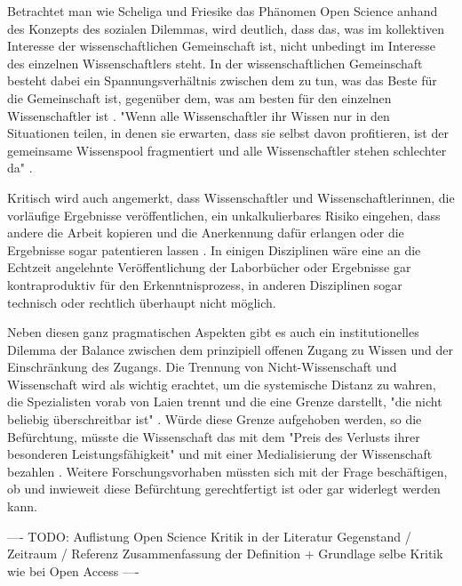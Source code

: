 Betrachtet man wie Scheliga und Friesike das Phänomen Open Science anhand des Konzepts des sozialen Dilemmas, wird deutlich, dass das, was im kollektiven Interesse der wissenschaftlichen Gemeinschaft ist, nicht unbedingt im Interesse des einzelnen Wissenschaftlers steht. In der wissenschaftlichen Gemeinschaft besteht dabei ein Spannungsverhältnis zwischen dem zu tun, was das Beste für die Gemeinschaft ist, gegenüber dem, was am besten für den einzelnen Wissenschaftler ist \cite{Ekins_2014} \cite{Patlak_2010} \cite{Wein_2010}. "Wenn alle Wissenschaftler ihr Wissen nur in den Situationen teilen, in denen sie erwarten, dass sie selbst davon profitieren, ist der gemeinsame Wissenspool fragmentiert und alle Wissenschaftler stehen schlechter da" \cite{Scheliga_2014}.

Kritisch wird auch angemerkt, dass Wissenschaftler und Wissenschaftlerinnen, die vorläufige Ergebnisse veröffentlichen, ein unkalkulierbares Risiko eingehen, dass andere die Arbeit kopieren und die Anerkennung dafür erlangen oder die Ergebnisse sogar patentieren lassen \cite{Peters_2014}. In einigen Disziplinen wäre eine an die Echtzeit angelehnte Veröffentlichung der Laborbücher oder Ergebnisse gar kontraproduktiv für den Erkenntnisprozess, in anderen Disziplinen sogar technisch oder rechtlich überhaupt nicht möglich.

Neben diesen ganz pragmatischen Aspekten gibt es auch ein institutionelles Dilemma der Balance zwischen dem prinzipiell offenen Zugang zu Wissen und der Einschränkung des Zugangs. Die Trennung von Nicht-Wissenschaft und Wissenschaft wird als wichtig erachtet, um die systemische Distanz zu wahren, die Spezialisten vorab von Laien trennt und die eine Grenze darstellt, "die nicht beliebig überschreitbar ist" \cite{Weingart_2005}. Würde diese Grenze aufgehoben werden, so die Befürchtung, müsste die Wissenschaft das mit dem "Preis des Verlusts ihrer besonderen Leistungsfähigkeit" und mit einer Medialisierung der Wissenschaft bezahlen \cite{Weingart_2005}. Weitere Forschungsvorhaben müssten sich mit der Frage beschäftigen, ob und inwieweit diese Befürchtung gerechtfertigt ist oder gar widerlegt werden kann.

---- TODO: Auflistung Open Science Kritik in der Literatur Gegenstand / Zeitraum / Referenz Zusammenfassung der Definition + Grundlage selbe Kritik wie bei Open Access ----
